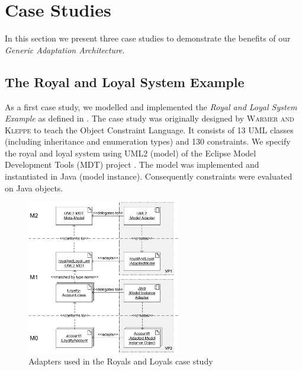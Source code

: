 \section{Case Studies}

In this section we present three case studies to demonstrate the benefits of our
\emph{Generic Adaptation Architecture}.


\subsection{The Royal and Loyal System Example}

As a first case study, we modelled and implemented the \textit{Royal and Loyal System Example} 
as defined in \cite{warmer:ocl}. The case study was originally designed by \textsc{Warmer
and Kleppe} to teach the Object Constraint Language. It consists of
13 UML classes (including inheritance and enumeration types) and 130 constraints. 
We specify the royal and loyal system using UML2 (model) of the
Eclipse Model Development Tools (MDT) project \cite{WWW:MDT}.
The model was implemented and instantiated in Java (model instance).
Consequently constraints were evaluated on Java objects.

\begin{figure}[!t]
	\centering
		\includegraphics[width=0.60\textwidth]{figures/casestudy01.pdf}
	\caption{
	Adapters used in the Royals and Loyals case study
	  }
	\label{fig:casestudy01}
\end{figure}


